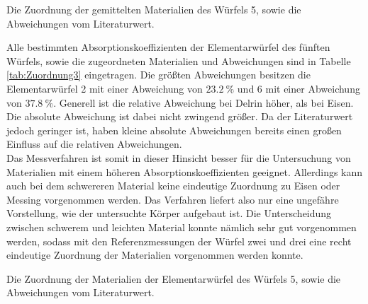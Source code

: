 \begin{table}
	\centering
	\caption{Die Zuordnung der gemittelten Materialien des Würfels 5, sowie die Abweichungen vom Literaturwert.}
	
	\label{tab:Zuordnung2}
\end{table}

\newpage
\noindent Alle bestimmten Absorptionskoeffizienten der Elementarwürfel des fünften Würfels, sowie die zugeordneten Materialien und Abweichungen sind in Tabelle \ref{tab:Zuordnung3} eingetragen. Die größten Abweichungen besitzen die Elementarwürfel 2 mit einer Abweichung von $\SI{23.2}{\%}$ und 6 mit einer Abweichung von $\SI{37.8}{\%}$. Generell ist die relative Abweichung bei Delrin höher, als bei Eisen. Die absolute Abweichung ist dabei nicht zwingend größer. Da der Literaturwert jedoch geringer ist, haben kleine absolute Abweichungen bereits einen großen Einfluss auf die relativen Abweichungen.\\
Das Messverfahren ist somit in dieser Hinsicht besser für die Untersuchung von Materialien mit einem höheren Absorptionskoeffizienten geeignet. Allerdings kann auch bei dem schwereren Material keine eindeutige Zuordnung zu Eisen oder Messing vorgenommen werden. Das Verfahren liefert also nur eine ungefähre Vorstellung, wie der untersuchte Körper aufgebaut ist. Die Unterscheidung zwischen schwerem und leichten Material konnte nämlich sehr gut vorgenommen werden, sodass mit den Referenzmessungen der Würfel zwei und drei eine recht eindeutige Zuordnung der Materialien vorgenommen werden konnte.        

\begin{table}
	\centering
	\caption{Die Zuordnung der Materialien der Elementarwürfel des Würfels 5, sowie die Abweichungen vom Literaturwert.}
	
	\label{tab:Zuordnung3}
\end{table}